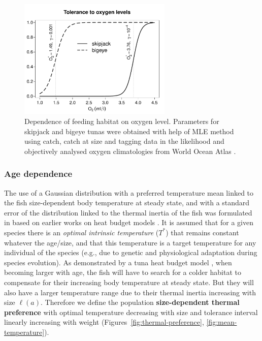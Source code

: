 \begin{figure}%
	\centering
        \includegraphics[width=0.65\textwidth]{chapter1/figs/fig-oxyfuncs}
	\caption{Dependence of feeding habitat on oxygen level. Parameters for skipjack and bigeye tunas were obtained with help of MLE method using catch, catch at size and tagging data in the likelihood and objectively analysed oxygen climatologies from World Ocean Atlas \citep{Senina2018, Senina2021}.}
	\label{fig:oxygen-tolerance}
\end{figure}

\subsubsection{Age dependence}\label{sec:age-dependence}

The use of a Gaussian distribution with a preferred temperature mean linked to the fish size-dependent body temperature at steady state, and with a standard error of the distribution linked to the thermal inertia of the fish was formulated in \citet{Lehodey2003} based on earlier works on heat budget models \citep{Holland,Brill,Maury}. It is assumed that for a given species there is an \textit{optimal intrinsic temperature} ($T^{*}$) that remains constant whatever the age/size, and that this temperature is a target temperature for any individual of the species (e.g., due to genetic and physiological adaptation during species evolution). As demonstrated by a tuna heat budget model \citep{Holland}, when becoming larger with age, the fish will have to search for a colder habitat to compensate for their increasing body temperature at steady state. But they will also have a larger temperature range due to their thermal inertia increasing with size $\ell(a)$. Therefore we define the population \textbf{size-dependent thermal preference} with optimal temperature decreasing with size and tolerance interval linearly increasing with weight (Figures~\ref{fig:thermal-preference}, \ref{fig:mean-temperature}).

